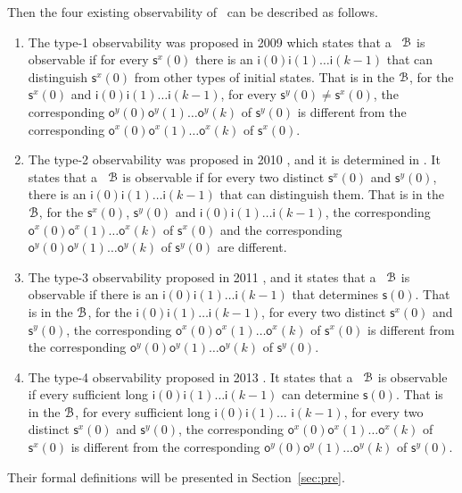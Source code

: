 Then the four existing observability of \BCNs\ can be described as follows. 
\begin{enumerate}
	\item The  type-1 observability was proposed in 2009 \cite{cheng2009controllability} which states that a \BCN\ ${\mathcal{B}}$ is observable if for every $\mathsf{s}^{x}(0)$ there is an $\mathsf{i}(0)\mathsf{i}(1)\ldots\mathsf{i}(k-1)$ that can distinguish $\mathsf{s}^{x}(0)$ from other types of initial states. That is in the ${\mathcal{B}}$, for the $\mathsf{s}^{x}(0)$ and $\mathsf{i}(0)$$\mathsf{i}(1)\ldots$$\mathsf{i}(k-1)$, for every $\mathsf{s}^{y}(0)\ne\mathsf{s}^{x}(0)$, the corresponding $\mathsf{o}^{y}(0)$$\mathsf{o}^{y}(1)\ldots$$\mathsf{o}^{y}(k)$ of $\mathsf{s}^{y}(0)$ is different from the corresponding $\mathsf{o}^{x}(0)$$\mathsf{o}^{x}(1)\ldots$$\mathsf{o}^{x}(k)$ of $\mathsf{s}^{x}(0)$. 
	\item 
	The  type-2 observability was proposed in 2010 \cite{Zhao2010Input}, and it is determined in \cite{Li2015Controllability} . It states that a \BCN\ ${\mathcal{B}}$ is observable if for every two distinct $\mathsf{s}^{x}(0)$ and $\mathsf{s}^{y}(0)$, there is an $\mathsf{i}(0)$$\mathsf{i}(1)\ldots$$\mathsf{i}(k-1)$ that can distinguish them. That is in the ${\mathcal{B}}$, for the $\mathsf{s}^{x}(0)$, $\mathsf{s}^{y}(0)$ and $\mathsf{i}(0)\mathsf{i}(1)\ldots\mathsf{i}(k-1)$, the corresponding $\mathsf{o}^{x}(0)\mathsf{o}^{x}(1)\ldots\mathsf{o}^{x}(k)$ of $\mathsf{s}^{x}(0)$ and the corresponding $\mathsf{o}^{y}(0)\mathsf{o}^{y}(1)\ldots\mathsf{o}^{y}(k)$ of $\mathsf{s}^{y}(0)$ are different.
	\item The  type-3 observability proposed in 2011 \cite{Cheng2011Identification}, and it states that a \BCN\ ${\mathcal{B}}$ is observable if there is an $\mathsf{i}(0)$$\mathsf{i}(1)\ldots$$\mathsf{i}(k-1)$ that determines $\mathsf{s}(0)$. That is in the ${\mathcal{B}}$, for the $\mathsf{i}(0)$$\mathsf{i}(1)\ldots$$\mathsf{i}(k-1)$, for every two distinct $\mathsf{s}^{x}(0)$ and $\mathsf{s}^{y}(0)$, the corresponding $\mathsf{o}^{x}(0)$$\mathsf{o}^{x}(1)\ldots$$\mathsf{o}^{x}(k)$ of $\mathsf{s}^{x}(0)$ is different from the corresponding $\mathsf{o}^{y}(0)$$\mathsf{o}^{y}(1)\ldots$$\mathsf{o}^{y}(k)$ of $\mathsf{s}^{y}(0)$.
	
	\item  The  type-4 observability proposed in 2013 \cite{Fornasini2013Observability}. It states that a \BCN\ ${\mathcal{B}}$ is observable if every sufficient long $\mathsf{i}(0)$$\mathsf{i}(1)\ldots$$\mathsf{i}(k-1)$ can determine $\mathsf{s}(0)$. That is in the ${\mathcal{B}}$, for every sufficient long $\mathsf{i}(0)$$\mathsf{i}(1)\ldots$ $\mathsf{i}(k-1)$, for every two distinct $\mathsf{s}^{x}(0)$ and $\mathsf{s}^{y}(0)$, the corresponding $\mathsf{o}^{x}(0)$$\mathsf{o}^{x}(1)\ldots$$\mathsf{o}^{x}(k)$ of $\mathsf{s}^{x}(0)$ is different from the corresponding $\mathsf{o}^{y}(0)$$\mathsf{o}^{y}(1)\ldots$$\mathsf{o}^{y}(k)$ of $\mathsf{s}^{y}(0)$.
\end{enumerate}
 Their formal definitions will be presented in Section~\ref{sec:pre}.

